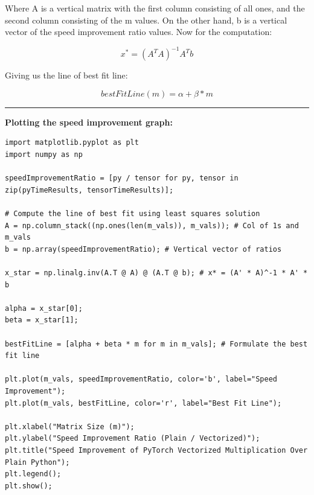 \documentclass[12pt]{article}
\begin{document}
\noindent Where A is a vertical matrix with the first column consisting of all ones, and the second column consisting of the m values.
On the other hand, b is a vertical vector of the speed improvement ratio values. Now for the computation:

\begin{equation*}
    x^* = (A^T A)^{-1} A^T b
\end{equation*}

\noindent Giving us the line of best fit line:

\begin{equation*}
    bestFitLine(m) = \alpha + \beta * m
\end{equation*}

\newpage

\noindent\rule{\textwidth}{0.4pt}
\noindent\textbf{Plotting the speed improvement graph:}
\begin{lstlisting}
import matplotlib.pyplot as plt
import numpy as np

speedImprovementRatio = [py / tensor for py, tensor in zip(pyTimeResults, tensorTimeResults)];

# Compute the line of best fit using least squares solution
A = np.column_stack((np.ones(len(m_vals)), m_vals)); # Col of 1s and m_vals
b = np.array(speedImprovementRatio); # Vertical vector of ratios

x_star = np.linalg.inv(A.T @ A) @ (A.T @ b); # x* = (A' * A)^-1 * A' * b

alpha = x_star[0];
beta = x_star[1];

bestFitLine = [alpha + beta * m for m in m_vals]; # Formulate the best fit line

plt.plot(m_vals, speedImprovementRatio, color='b', label="Speed Improvement");
plt.plot(m_vals, bestFitLine, color='r', label="Best Fit Line");

plt.xlabel("Matrix Size (m)");
plt.ylabel("Speed Improvement Ratio (Plain / Vectorized)");
plt.title("Speed Improvement of PyTorch Vectorized Multiplication Over Plain Python");
plt.legend();
plt.show();
\end{lstlisting}

\newpage
\end{document}
